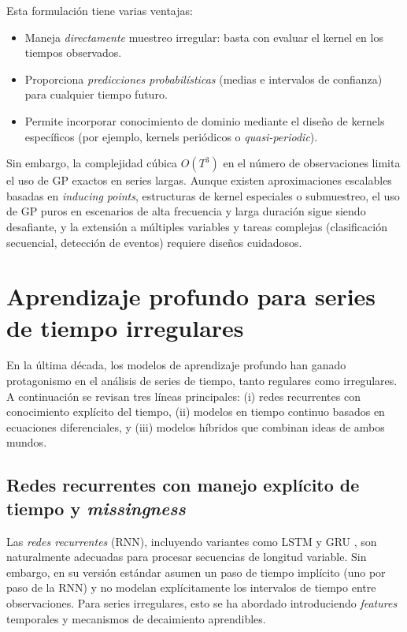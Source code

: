 Esta formulación tiene varias ventajas:
\begin{itemize}
    \item Maneja \textit{directamente} muestreo irregular: basta con evaluar el kernel en los tiempos observados.
    \item Proporciona \textit{predicciones probabilísticas} (medias e intervalos de confianza) para cualquier tiempo futuro.
    \item Permite incorporar conocimiento de dominio mediante el diseño de kernels específicos (por ejemplo, kernels periódicos o \emph{quasi-periodic}).
\end{itemize}

Sin embargo, la complejidad cúbica $O(T^3)$ en el número de observaciones limita el uso de GP exactos en series largas. Aunque existen aproximaciones escalables basadas en \emph{inducing points}, estructuras de kernel especiales o submuestreo, el uso de GP puros en escenarios de alta frecuencia y larga duración sigue siendo desafiante, y la extensión a múltiples variables y tareas complejas (clasificación secuencial, detección de eventos) requiere diseños cuidadosos.

\section{Aprendizaje profundo para series de tiempo irregulares}
\label{sec:estado-arte-deep}

En la última década, los modelos de aprendizaje profundo han ganado protagonismo en el análisis de series de tiempo, tanto regulares como irregulares. A continuación se revisan tres líneas principales: (i) redes recurrentes con conocimiento explícito del tiempo, (ii) modelos en tiempo continuo basados en ecuaciones diferenciales, y (iii) modelos híbridos que combinan ideas de ambos mundos.

\subsection{Redes recurrentes con manejo explícito de tiempo y \emph{missingness}}

Las \textit{redes recurrentes} (RNN), incluyendo variantes como LSTM y GRU \cite{hochreiter1997long,gers2000learning,cho2014learning,chung2014empirical}, son naturalmente adecuadas para procesar secuencias de longitud variable. Sin embargo, en su versión estándar asumen un paso de tiempo implícito (uno por paso de la RNN) y no modelan explícitamente los intervalos de tiempo entre observaciones. Para series irregulares, esto se ha abordado introduciendo \emph{features} temporales y mecanismos de decaimiento aprendibles.

